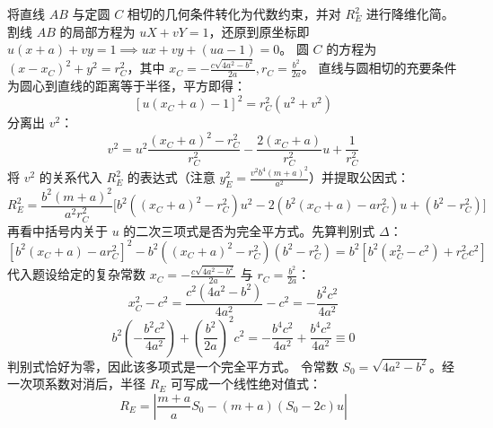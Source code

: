 \begin{solution}
将直线 $AB$ 与定圆 $C$ 相切的几何条件转化为代数约束，并对 $R_E^2$ 进行降维化简。
割线 $AB$ 的局部方程为 $uX + vY = 1$，还原到原坐标即 $u(x+a) + vy = 1 \implies ux + vy + (ua - 1) = 0$。
圆 $C$ 的方程为 $(x - x_C)^2 + y^2 = r_C^2$，其中 $x_C = -\frac{c\sqrt{4a^2-b^2}}{2a}, r_C = \frac{b^2}{2a}$。
直线与圆相切的充要条件为圆心到直线的距离等于半径，平方即得：
$$ [u(x_C + a) - 1]^2 = r_C^2(u^2 + v^2) $$
分离出 $v^2$：
$$ v^2 = u^2 \frac{(x_C+a)^2 - r_C^2}{r_C^2} - \frac{2(x_C+a)}{r_C^2}u + \frac{1}{r_C^2} $$
将 $v^2$ 的关系代入 $R_E^2$ 的表达式（注意 $y_E^2 = \frac{v^2 b^4(m+a)^2}{a^2}$）并提取公因式：
$$ R_E^2 = \frac{b^2(m+a)^2}{a^2 r_C^2} \Big[ b^2((x_C+a)^2 - r_C^2)u^2 - 2(b^2(x_C+a) - a r_C^2)u + (b^2 - r_C^2) \Big] $$
再看中括号内关于 $u$ 的二次三项式是否为完全平方式。先算判别式 $\Delta$：
$$ [b^2(x_C+a) - a r_C^2]^2 - b^2((x_C+a)^2 - r_C^2)(b^2 - r_C^2) = b^2 [b^2(x_C^2 - c^2) + r_C^2 c^2] $$
代入题设给定的复杂常数 $x_C = -\frac{c\sqrt{4a^2-b^2}}{2a}$ 与 $r_C = \frac{b^2}{2a}$：
$$ x_C^2 - c^2 = \frac{c^2(4a^2-b^2)}{4a^2} - c^2 = -\frac{b^2 c^2}{4a^2} $$
$$ b^2\left(-\frac{b^2 c^2}{4a^2}\right) + \left(\frac{b^2}{2a}\right)^2 c^2 = -\frac{b^4 c^2}{4a^2} + \frac{b^4 c^2}{4a^2} \equiv 0 $$
判别式恰好为零，因此该多项式是一个完全平方式。
令常数 $S_0 = \sqrt{4a^2-b^2}$。经一次项系数对消后，半径 $R_E$ 可写成一个线性绝对值式：
$$ R_E = \left| \frac{m+a}{a}S_0 - (m+a)(S_0 - 2c)u \right| $$


\end{solution}
